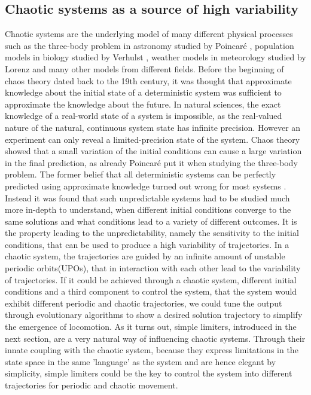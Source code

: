 \documentclass[main]{subfiles}
\begin{document}
\subsection{Chaotic systems as a source of high variability}

Chaotic systems are the underlying model of many different physical processes such as the three-body problem in astronomy studied by Poincaré \cite{bib:Poincare1892}, population models in biology studied by Verhulst \cite{bib:Verhulst1838}, weather models in meteorology studied by Lorenz \cite{bib:Lorenz1963} and many other models from different fields. Before the beginning of chaos theory dated back to the 19th century, it was thought that approximate knowledge about the initial state of a deterministic system was sufficient to approximate the knowledge about the future. In natural sciences, the exact knowledge of a real-world state of a system is impossible, as the real-valued nature of the natural, continuous system state has infinite precision. However an experiment can only reveal a limited-precision state of the system. Chaos theory showed that a small variation of the initial conditions can cause a large variation in the final prediction, as already Poincaré put it when studying the three-body problem. The former belief that all deterministic systems can be perfectly predicted using approximate knowledge turned out wrong for most systems \cite{bib:Motter2013}. Instead it was found that such unpredictable systems had to be studied much more in-depth to understand, when different initial conditions converge to the same solutions and what conditions lead to a variety of different outcomes. It is the property leading to the unpredictability, namely the sensitivity to the initial conditions, that can be used to produce a high variability of trajectories. In a chaotic system, the trajectories are guided by an infinite amount of unstable periodic orbits(UPOs), that in interaction with each other lead to the variability of trajectories. If it could be achieved through a chaotic system, different initial conditions and a third component to control the system, that the system would exhibit different periodic and chaotic trajectories, we could tune the output through evolutionary algorithms to show a desired solution trajectory to simplify the emergence of locomotion. As it turns out, simple limiters, introduced in the next section, are a very natural way of influencing chaotic systems. Through their innate coupling with the chaotic system, because they express limitations in the state space in the same 'language' as the system and are hence elegant by simplicity, simple limiters could be the key to control the system into different trajectories for periodic and chaotic movement.
\end{document}
